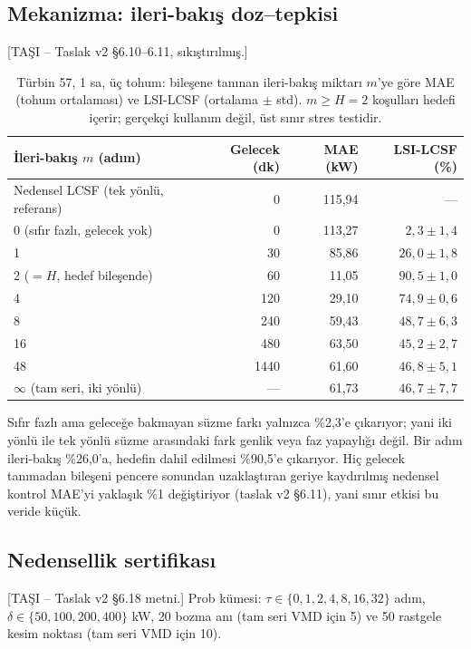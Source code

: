 \documentclass[11pt,a4paper]{article}
\newcommand{\tasi}[1]{\textsf{\small [TAŞI -- #1]}}
\begin{document}
\subsection{Mekanizma: ileri-bakış doz--tepkisi}
\tasi{Taslak v2 §6.10--6.11, sıkıştırılmış.}

\begin{table}[htbp]\centering
\caption{Türbin 57, 1 sa, üç tohum: bileşene tanınan ileri-bakış miktarı $m$'ye
göre MAE (tohum ortalaması) ve LSI-LCSF (ortalama $\pm$ std). $m\ge H=2$
koşulları hedefi içerir; gerçekçi kullanım değil, üst sınır stres testidir.}
\footnotesize
\begin{tabular}{lrrr}
\toprule
İleri-bakış $m$ (adım) & Gelecek (dk) & MAE (kW) & LSI-LCSF (\%) \\
\midrule
Nedensel LCSF (tek yönlü, referans) & 0 & 115,94 & --- \\
0 (sıfır fazlı, gelecek yok)        & 0 & 113,27 & $2,3\pm1,4$ \\
1                                   & 30 & 85,86 & $26,0\pm1,8$ \\
2 ($=H$, hedef bileşende)           & 60 & 11,05 & $90,5\pm1,0$ \\
4                                   & 120 & 29,10 & $74,9\pm0,6$ \\
8                                   & 240 & 59,43 & $48,7\pm6,3$ \\
16                                  & 480 & 63,50 & $45,2\pm2,7$ \\
48                                  & 1440 & 61,60 & $46,8\pm5,1$ \\
$\infty$ (tam seri, iki yönlü)      & --- & 61,73 & $46,7\pm7,7$ \\
\bottomrule
\end{tabular}
\end{table}

Sıfır fazlı ama geleceğe bakmayan süzme farkı yalnızca \%2,3'e çıkarıyor; yani
iki yönlü ile tek yönlü süzme arasındaki fark genlik veya faz yapaylığı değil.
Bir adım ileri-bakış \%26,0'a, hedefin dahil edilmesi \%90,5'e çıkarıyor. Hiç
gelecek tanımadan bileşeni pencere sonundan uzaklaştıran geriye kaydırılmış
nedensel kontrol MAE'yi yaklaşık \%1 değiştiriyor (taslak v2 §6.11), yani sınır
etkisi bu veride küçük.

\subsection{Nedensellik sertifikası}
\tasi{Taslak v2 §6.18 metni.} Prob kümesi: $\tau\in\{0,1,2,4,8,16,32\}$ adım,
$\delta\in\{50,100,200,400\}$ kW, 20 bozma anı (tam seri VMD için 5) ve
50 rastgele kesim noktası (tam seri VMD için 10).
\end{document}
